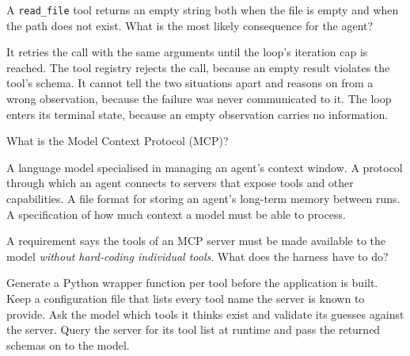 \begin{questions}
\qitem A \texttt{read\_file} tool returns an empty string both when the file is empty and when the path
does not exist. What is the most likely consequence for the agent?
\begin{choices}
  \choice It retries the call with the same arguments until the loop's iteration cap is reached.
  \choice The tool registry rejects the call, because an empty result violates the tool's schema.
  \CorrectChoice It cannot tell the two situations apart and reasons on from a wrong observation, because the failure was never communicated to it.
  \choice The loop enters its terminal state, because an empty observation carries no information.
\end{choices}
\dontknow
{}

\qitem What is the Model Context Protocol (MCP)?
\begin{choices}
  \choice A language model specialised in managing an agent's context window.
  \CorrectChoice A protocol through which an agent connects to servers that expose tools and other capabilities.
  \choice A file format for storing an agent's long-term memory between runs.
  \choice A specification of how much context a model must be able to process.
\end{choices}
\dontknow
{}

\qitem A requirement says the tools of an MCP server must be made available to the model \emph{without
hard-coding individual tools}. What does the harness have to do?
\begin{choices}
  \choice Generate a Python wrapper function per tool before the application is built.
  \choice Keep a configuration file that lists every tool name the server is known to provide.
  \choice Ask the model which tools it thinks exist and validate its guesses against the server.
  \CorrectChoice Query the server for its tool list at runtime and pass the returned schemas on to the model.
\end{choices}
\dontknow
{}


\end{questions}

